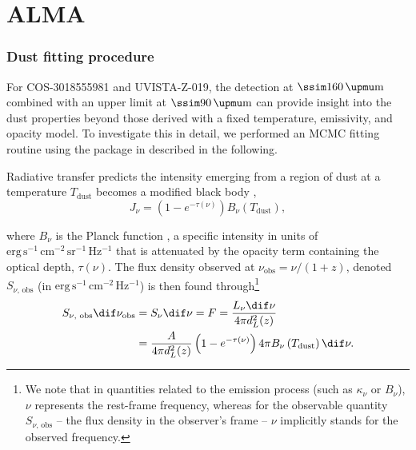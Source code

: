 
\chapter{ALMA}
\label{ch:ALMA}

\subsection{Dust \texorpdfstring{}{SED} fitting procedure}
\label{ssec:Discussion: Dust SED fitting procedure}

For COS-3018555981 and UVISTA-Z-019, the detection at $\ssim 160 \, \mathrm{\upmu m}$ combined with an upper limit at $\ssim 90 \, \mathrm{\upmu m}$ can provide insight into the dust properties beyond those derived with a fixed temperature, emissivity, and opacity model. To investigate this in detail, we performed an \gls{MCMC} fitting routine using the  package in  described in the following.

Radiative transfer predicts the intensity emerging from a region of dust at a temperature $T_\text{dust}$ becomes a modified black body \citep[often referred to as a greybody;][]{2020MNRAS.498.4109J},
\begin{equation}
    \label{eq:Dust radiative transfer}
    J_\nu = \left( 1 - e^{-\tau (\nu)} \right) B_\nu \left( T_\text{dust} \right),
\end{equation}

\noindent where $B_\nu$ is the Planck function \citep{1901AnP...309..553P}, a specific intensity in units of $\mathrm{erg \, s^{-1} \, cm^{-2} \, sr^{-1} \, Hz^{-1}}$ that is attenuated by the opacity term containing the optical depth, $\tau (\nu)$. 
The flux density observed at $\nu_\text{obs} = \nu / (1+z)$, denoted $S_{\nu\text{, obs}}$ (in $\mathrm{erg \, s^{-1} \, cm^{-2} \, Hz^{-1}}$) is then found through\footnote{We note that in quantities related to the emission process (such as $\kappa_\nu$ or $B_\nu$), $\nu$ represents the rest-frame frequency, whereas for the observable quantity $S_{\nu\text{, obs}}$ -- the flux density in the observer's frame -- $\nu$ implicitly stands for the observed frequency.}
\begin{align*}
    S_{\nu\text{, obs}} \dif \nu_\text{obs} & = S_\nu \dif \nu = F = \frac{L_\nu \dif \nu}{4 \pi d_L^2(z)}
    \\
    & = \frac{A}{4 \pi d_L^2(z)} \left( 1 - e^{-\tau (\nu)} \right) 4 \pi B_\nu \left( T_\text{dust} \right) \dif \nu.
\end{align*}

